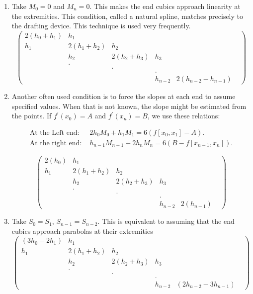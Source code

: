 \begin{enumerate}
\item
Take $M_0=0$ and $M_n=0$.  This makes the end cubics approach linearity at the extremities.  This condition, called a natural spline, matches precisely to the 
drafting device. This technique is used very frequently.
\[ 
	\left( \begin{array}{cccccc}
      2(h_0+h_1) & h_1 & & & &\\
      h_1 & 2(h_1+h_2) & h_2& & &\\
       & h_2 & 2(h_2+h_3)&h_3 & &\\
       & . & & & &\\
       &  &. & & &\\
       &  & &. & &\\
      & &  & h_{n-2} &2(h_{n-2}-h_{n-1}) &\end{array} \right)
\]

\item
Another often used condition is to force the slopes at each end to assume specified values.  When that is not known, the slope might be estimated from the points.
If $f^{'}(x_0)=A$ and $f^{'}(x_n)=B$, we use these relations:

\begin{eqnarray}\label{end points} \mbox{At the Left end:  }& 2h_0M_0+h_1M_1=6(f[x_0,x_1]-A). \\
\mbox{At the right end:  } &h_{n-1}M_{n-1}+2h_{n}M_{n}=6(B-f[x_{n-1},x_n]). \end{eqnarray}

\[ 
	\left( \begin{array}{cccccc}
      2(h_0) & h_1 & & & &\\
      h_1 & 2(h_1+h_2) & h_2& & &\\
       & h_2 & 2(h_2+h_3)&h_3 & &\\
       & . & & & &\\
       &  &. & & &\\
       &  & &. & &\\
      & &  & h_{n-2} &2(h_{n-1}) &\end{array} \right)
\]

\item
Take $S_0=S_1$, $S_{n-1}=S_{n-2}$.  This is equivalent  to assuming that the end cubics approach parabolas at their extremities
\[ 
	\left( \begin{array}{cccccc}
      (3h_0+2h_1) & h_1 & & & &\\
      h_1 & 2(h_1+h_2) & h_2& & &\\
       & h_2 & 2(h_2+h_3)&h_3 & &\\
       & . & & & &\\
       &  &. & & &\\
       &  & &. & &\\
      & &  & h_{n-2} &(2h_{n-2}-3h_{n-1}) &\end{array} \right)
\]

\end{enumerate}
